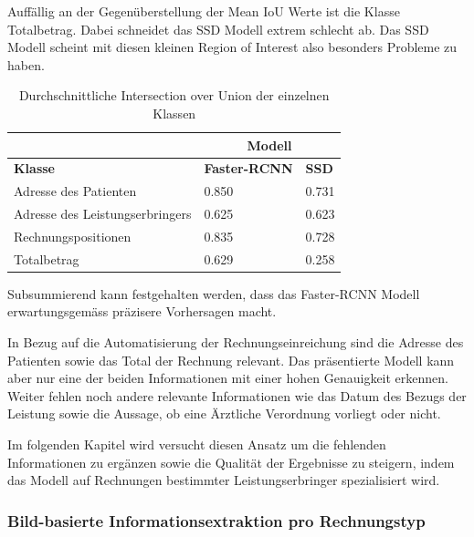 Auffällig an der Gegenüberstellung der Mean IoU Werte ist die Klasse Totalbetrag. Dabei schneidet das SSD Modell extrem schlecht ab. Das SSD Modell scheint mit diesen kleinen Region of Interest also besonders Probleme zu haben.

\begin{table}[h!]
    \centering
    \captionsetup{width=.9\linewidth}
    \caption{Durchschnittliche Intersection over Union der einzelnen Klassen}
    \label{tab:3ap-iou}
    \begin{tabular}{|l|l|l|}
    \hhline{~|--|}    
    \multicolumn{1}{c|}{}
                                    & \multicolumn{2}{c|}{\cellcolor[HTML]{DDDDDD}\textbf{Modell}}  \\
    \hline
    \rowcolor[HTML]{DDDDDD}
    \textbf{Klasse}                          & \textbf{Faster-RCNN} & \textbf{SSD}           \\
    \hline
    Adresse des Patienten           & 0.850       & 0.731         \\
    \hline
    Adresse des Leistungserbringers & 0.625       & 0.623         \\
    \hline
    Rechnungspositionen             & 0.835       & 0.728         \\
    \hline
    Totalbetrag                     & 0.629       & 0.258         \\  
    \hline
    \end{tabular}
\end{table}

Subsummierend kann festgehalten werden, dass das Faster-RCNN Modell erwartungsgemäss präzisere Vorhersagen macht. 

In Bezug auf die Automatisierung der Rechnungseinreichung sind die Adresse des Patienten sowie das Total der Rechnung relevant. Das präsentierte Modell kann aber nur eine der beiden Informationen mit einer hohen Genauigkeit erkennen. Weiter fehlen noch andere relevante Informationen wie das Datum des Bezugs der Leistung sowie die Aussage, ob eine Ärztliche Verordnung vorliegt oder nicht. 

Im folgenden Kapitel wird versucht diesen Ansatz um die fehlenden Informationen zu ergänzen sowie die Qualität der Ergebnisse zu steigern, indem das Modell auf Rechnungen bestimmter Leistungserbringer spezialisiert wird.


\subsubsection{Bild-basierte Informationsextraktion pro Rechnungstyp}
\label{chap:lerb-specific-ie}

